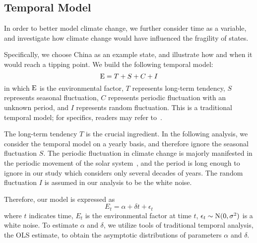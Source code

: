 
\subsection{Temporal Model}
\label{sec:model2}
In order to better model climate change, we further consider time as a variable, and investigate how climate change would have influenced the fragility of states. 

Specifically, we choose China as an example state, and illustrate how and when it would reach a tipping point. We build the following temporal model:
\begin{equation}
    \operatorname*{E} = T+S+C+I
   \label{eqn:model:temporal} 
\end{equation}
in which $\operatorname*{E}$ is the environmental factor, $T$ represents long-term tendency, $S$ represents seasonal fluctuation, $C$ represents periodic fluctuation with an unknown period, and $I$ represents random fluctuation. This is a traditional temporal model; for specifics, readers may refer to~.

The long-term tendency $T$ is the crucial ingredient. In the following analysis, we consider the temporal model on a yearly basis, and therefore ignore the seasonal fluctuation $S$. The periodic fluctuation in climate change is majorly manifested in the periodic movement of the solar system~, and the period is long enough to ignore in our study which considers only several decades of years. The random fluctuation $I$ is assumed in our analysis to be the white noise. %

Therefore, our model is expressed as 
\begin{equation}
    E_t = \alpha +\delta t +\epsilon_t
   \label{eqn:model:temporal:tend} 
\end{equation}
where $t$ indicates time, $E_t$ is the environmental factor at time $t$, $\epsilon_t \sim \rm{N}(0,\sigma^2)$ is a white noise. To estimate $\alpha$ and $\delta$, we utilize tools of traditional temporal analysis, the OLS estimate, to obtain the asymptotic distributions of parameters $\alpha$ and $\delta$.


